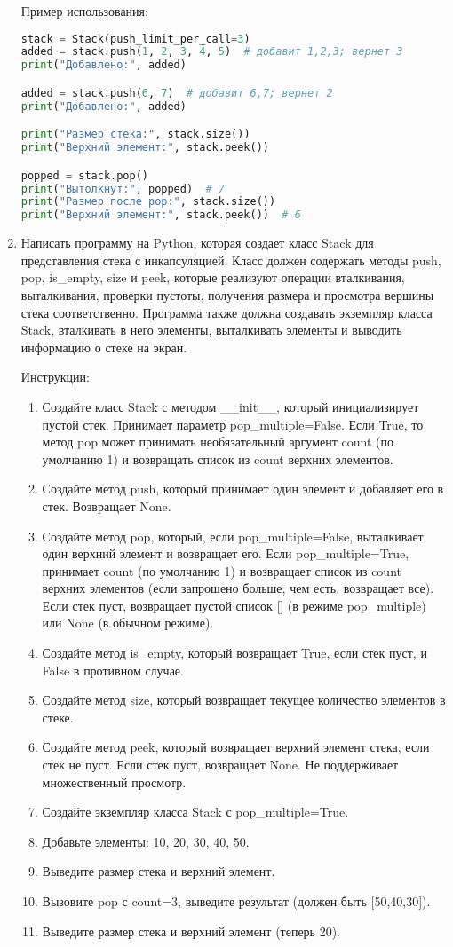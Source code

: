 \begin{enumerate}
Пример использования:
\begin{lstlisting}[language=Python]
stack = Stack(push_limit_per_call=3)
added = stack.push(1, 2, 3, 4, 5)  # добавит 1,2,3; вернет 3
print("Добавлено:", added)

added = stack.push(6, 7)  # добавит 6,7; вернет 2
print("Добавлено:", added)

print("Размер стека:", stack.size())
print("Верхний элемент:", stack.peek())

popped = stack.pop()
print("Вытолкнут:", popped)  # 7
print("Размер после pop:", stack.size())
print("Верхний элемент:", stack.peek())  # 6
\end{lstlisting}

\item Написать программу на Python, которая создает класс Stack для представления стека с инкапсуляцией. Класс должен содержать методы push, pop, is\_empty, size и peek, которые реализуют операции вталкивания, выталкивания, проверки пустоты, получения размера и просмотра вершины стека соответственно. Программа также должна создавать экземпляр класса Stack, вталкивать в него элементы, выталкивать элементы и выводить информацию о стеке на экран.

Инструкции:
\begin{enumerate}
    \item Создайте класс Stack с методом \_\_init\_\_, который инициализирует пустой стек. Принимает параметр pop\_multiple=False. Если True, то метод pop может принимать необязательный аргумент count (по умолчанию 1) и возвращать список из count верхних элементов.
    \item Создайте метод push, который принимает один элемент и добавляет его в стек. Возвращает None.
    \item Создайте метод pop, который, если pop\_multiple=False, выталкивает один верхний элемент и возвращает его. Если pop\_multiple=True, принимает count (по умолчанию 1) и возвращает список из count верхних элементов (если запрошено больше, чем есть, возвращает все). Если стек пуст, возвращает пустой список [] (в режиме pop\_multiple) или None (в обычном режиме).
    \item Создайте метод is\_empty, который возвращает True, если стек пуст, и False в противном случае.
    \item Создайте метод size, который возвращает текущее количество элементов в стеке.
    \item Создайте метод peek, который возвращает верхний элемент стека, если стек не пуст. Если стек пуст, возвращает None. Не поддерживает множественный просмотр.
    \item Создайте экземпляр класса Stack с pop\_multiple=True.
    \item Добавьте элементы: 10, 20, 30, 40, 50.
    \item Выведите размер стека и верхний элемент.
    \item Вызовите pop с count=3, выведите результат (должен быть [50,40,30]).
    \item Выведите размер стека и верхний элемент (теперь 20).
\end{enumerate}


\end{enumerate}
